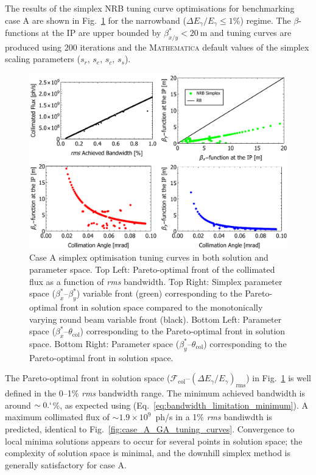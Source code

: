 \documentclass[../main.tex]{subfiles}
\begin{document}
The results of the simplex NRB tuning curve optimisations for benchmarking case A are shown in Fig.~\ref{fig:case_A_simplex_tuning_curves} for the narrowband ($\Delta E_{\gamma}/E_{\gamma} \leq1$\%) regime. The $\beta$-functions at the IP are upper bounded by $\beta_{x/y}^{*} < 20~\mathrm{\si{\meter}}$ and tuning curves are produced using 200 iterations and the \textsc{Mathematica} \cite{wolfram2021nmaximize} default values of the simplex scaling parameters ($s_{r}$, $s_{e}$, $s_{c}$, $s_{s}$). 
\begin{figure}[!h]
\centering
\includegraphics[width=\textwidth]{Figures/Optimisation_and_Characterisation_of_Inverse_Compton_Scattering_Sources/Case_A_simplex_Tuning_Curves.pdf}
\caption{Case A simplex optimisation tuning curves in both solution and parameter space. Top Left: Pareto-optimal front of the collimated flux as a function of \textit{rms} bandwidth. Top Right: Simplex parameter space ($\beta_{x}^{*}$--$\beta_{y}^{*}$) variable front (green) corresponding to the Pareto-optimal front in solution space compared to the monotonically varying round beam variable front (black). Bottom Left: Parameter space ($\beta_{x}^{*}$--$\theta_{\mathrm{col}}$) corresponding to the Pareto-optimal front in solution space. Bottom Right: Parameter space ($\beta_{y}^{*}$--$\theta_{\mathrm{col}}$) corresponding to the Pareto-optimal front in solution space.}
\label{fig:case_A_simplex_tuning_curves}
\end{figure}

The Pareto-optimal front in solution space ($\mathcal{F}_{\mathrm{col}}$--$\left(\Delta E_{\gamma}/E_{\gamma}\right)_{\mathrm{rms}}$) in Fig.~\ref{fig:case_A_simplex_tuning_curves} is well defined in the 0--1\% \textit{rms} bandwidth range. The minimum achieved bandwidth is around $\sim0.`$\%, as expected using (Eq.~\ref{eq:bandwidth_limitation_minimum}). A maximum collimated flux of $\sim 1.9\times 10^{9}$~ph/\si{\second} in a 1\% \textit{rms} bandiwdth is predicted, identical to Fig.~\ref{fig:case_A_GA_tuning_curves}. Convergence to local minima solutions appears to occur for several points in solution space; the complexity of solution space is minimal, and the downhill simplex method is generally satisfactory for case A.    
\end{document}

